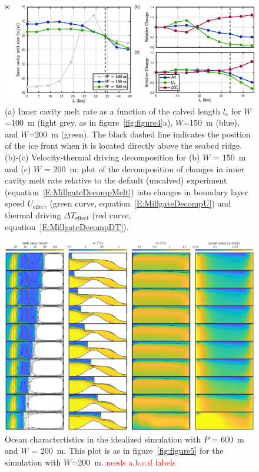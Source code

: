 \documentclass[draft]{agujournal2019}
\newcommand{\red}[1]{\textcolor{red}{#1}}
\begin{document}
\begin{figure}
    \centering
    \includegraphics[width = \textwidth]{../make_figures/plots/figure6.eps}
    \caption{(a) Inner cavity melt rate as a function of the calved length $l_c$ for $W$=100~m (light grey, as in figure~\ref{fig:figure4}a), $W$=150~m (blue), and $W$=200~m (green). The black dashed line indicates the position of the ice front when it is located directly above the seabed ridge. (b)-(c) Velocity-thermal driving decomposition for (b) $W$ = 150~m and (c) $W$ = 200~m: plot of the decomposition of changes in inner cavity melt rate relative to the default (uncalved) experiment (equation~\eqref{E:MillgateDecompMelt}) into changes in boundary layer speed $U_\text{effect}$ (green curve, equation~\eqref{E:MillgateDecompU}) and thermal driving $\Delta T_{\text{effect}}$ (red curve, equation~\eqref{E:MillgateDecompDT}).}
    \label{fig:figure6}
\end{figure}

\begin{figure}
    \centering
    \includegraphics[width = \textwidth]{../make_figures/plots/figure7.eps}
    \caption{Ocean charactertistics in the idealized simulation with $P$ = 600~m and $W$ = 200~m. This plot is as in figure~\ref{fig:figure5} for the simulation with $W$=200~m. \red{needs a,b,c,d labels}}
    \label{fig:figure7}
\end{figure}
\end{document}
